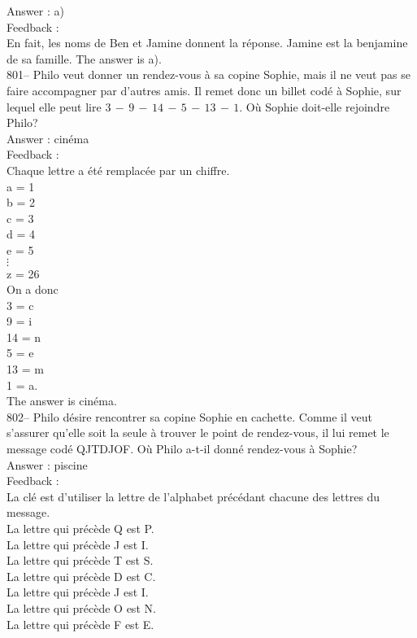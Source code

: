 \documentclass[letterpaper, 12pt]{article}
\begin{document}
Answer : a)\\

Feedback : \\
En fait, les noms de Ben et Jamine donnent la r\'eponse.  Jamine est la
benjamine de sa famille.  The answer is a).\\

801-- Philo veut donner un rendez-vous \`a sa copine Sophie, mais il ne veut
pas se faire accompagner par d'autres amis.  Il remet donc un billet cod\'e
\`a Sophie,  sur lequel elle peut lire $3\,-\,9\,-\,14\,-\,5\,-\,13\,-\,1$.
O\`u Sophie doit-elle rejoindre Philo?\\

Answer : cin\'ema\\

Feedback : \\
Chaque lettre a \'et\'e remplac\'ee par un chiffre. \\
a = 1\\
b = 2\\
c = 3\\
d = 4\\
e = 5\\
$\vdots$\\
z = 26\\

On a donc\\
3 = c\\
9 = i\\
14 = n\\
5 = e\\
13 = m\\
1 = a.\\

The answer is cin\'ema.\\

802-- Philo d\'esire rencontrer sa copine Sophie en cachette.  Comme il veut
s'assurer qu'elle soit la seule \`a trouver le point de rendez-vous, il lui
remet le message cod\'e QJTDJOF.  O\`u Philo a-t-il donn\'e rendez-vous \`a
Sophie?\\

Answer : piscine\\

Feedback : \\
La cl\'e est d'utiliser la lettre de l'alphabet pr\'ec\'edant chacune des
lettres du message.\\
La lettre qui pr\'ec\`ede Q est P.\\
La lettre qui pr\'ec\`ede J est I.\\
La lettre qui pr\'ec\`ede T est S.\\
La lettre qui pr\'ec\`ede D est C.\\
La lettre qui pr\'ec\`ede J est I.\\
La lettre qui pr\'ec\`ede O est N.\\
La lettre qui pr\'ec\`ede F est E.\\
\end{document}
